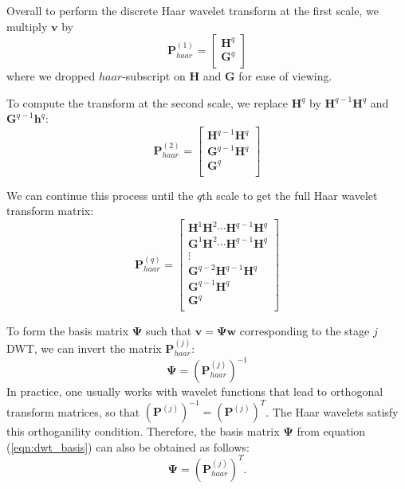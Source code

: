 Overall to perform the discrete Haar wavelet transform at the first scale, we multiply $\bm v$ by
\begin{equation*}
  \bm P^{(1)}_{haar} = \begin{bmatrix}
    \bm H^q \\
    \bm G^q \\
  \end{bmatrix}
\end{equation*}
where we dropped $haar$-subscript on $\bm H$ and $\bm G$ for ease of viewing.

To compute the transform at the second scale, we replace $\bm H^q$ by $\bm H^{q-1}\bm H^q$ and $\bm G^{q-1}\bm h^q$:
\begin{equation*}
  \bm P^{(2)}_{haar} = \begin{bmatrix}
    \bm H^{q-1} \bm H^q \\
    \bm G^{q-1} \bm H^q \\
    \bm G^q \\
  \end{bmatrix}
\end{equation*}

We can continue this process until the $q$th scale to get the full Haar wavelet transform matrix:
\begin{equation*}
  \bm P^{(q)}_{haar} = \begin{bmatrix}
    \bm H^1 \bm H^2 \cdots \bm H^{q-1} \bm H^q \\
    \bm G^1 \bm H^2 \cdots \bm H^{q-1} \bm H^q \\
    \vdots\\
    \bm G^{q-2} \bm H^{q-1} \bm H^q \\
    \bm G^{q-1} \bm H^q \\
    \bm G^q \\
  \end{bmatrix}
\end{equation*}

To form the basis matrix $\bm\Psi$ such that $\bm v = \bm\Psi\bm w$ corresponding to the stage $j$ DWT, we can invert the matrix $\bm P^{(j)}_{haar}$:
\begin{equation}
  \label{eqn:dwt_basis}
  \bm\Psi = \left(\bm P^{(j)}_{haar}\right)^{-1}
\end{equation}
In practice, one usually works with wavelet functions that lead to orthogonal transform matrices, so that $\left(\bm P^{(j)}\right)^{-1}=\left(\bm P^{(j)}\right)^T$.
The Haar wavelets satisfy this orthoganility condition.
Therefore, the basis matrix $\bm\Psi$ from equation (\ref{eqn:dwt_basis}) can also be obtained as follows:
\begin{equation}
  \label{eqn:haar1_basis}
  \bm\Psi = \left(\bm P^{(j)}_{haar}\right)^T.
\end{equation}

